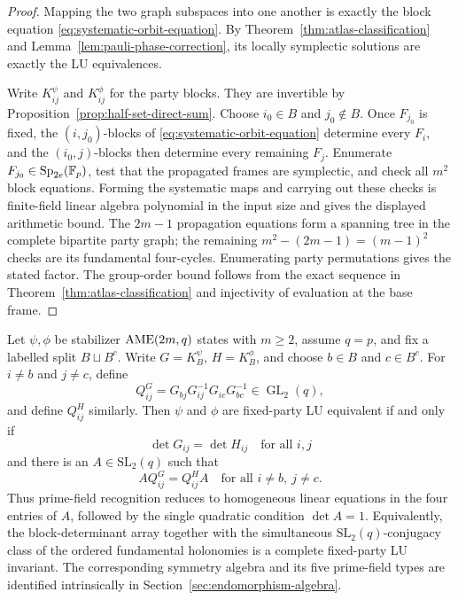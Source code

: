 \begin{proof}
Mapping the two graph subspaces into one another is exactly the block
equation \eqref{eq:systematic-orbit-equation}.  By Theorem~\ref{thm:atlas-classification} and
Lemma~\ref{lem:pauli-phase-correction}, its locally symplectic solutions
are exactly the LU equivalences.

Write \(K^\psi_{ij}\) and \(K^\phi_{ij}\) for the party blocks.  They are
invertible by Proposition~\ref{prop:half-set-direct-sum}.  Choose
\(i_0\in B\) and \(j_0\notin B\).  Once \(F_{j_0}\) is fixed, the
\((i,j_0)\)-blocks of \eqref{eq:systematic-orbit-equation} determine every \(F_i\), and the
\((i_0,j)\)-blocks then determine every remaining \(F_j\).  Enumerate
\(F_{j_0}\in\operatorname{Sp}_{2e}(\mathbb F_p)\), test that the propagated
frames are symplectic, and check all \(m^2\) block equations.  Forming the
systematic maps and carrying out these checks is finite-field linear
algebra polynomial in the input size and gives the displayed arithmetic
bound.  The \(2m-1\) propagation equations form a spanning tree in the
complete bipartite party graph; the remaining
\(m^2-(2m-1)=(m-1)^2\) checks are its fundamental four-cycles.
Enumerating party permutations gives the stated factor.  The group-order
bound follows from the exact sequence in
Theorem~\ref{thm:atlas-classification} and injectivity of evaluation at the
base frame.
\end{proof}

\begin{corollary}
\label{cor:prime-systematic-recognition}
Let \(\psi,\phi\) be stabilizer \(\mathrm{AME}(2m,q)\) states with \(m\geq2\),
assume \(q=p\), and fix a labelled split \(B\sqcup B^c\).  Write
\(G=K_B^\psi\), \(H=K_B^\phi\), and choose
\(b\in B\) and \(c\in B^c\).  For \(i\ne b\) and \(j\ne c\), define
\[
 Q^G_{ij}
 =G_{bj}G_{ij}^{-1}G_{ic}G_{bc}^{-1}\in\operatorname{GL}_2(q),
\]
and define \(Q^H_{ij}\) similarly.  Then \(\psi\) and \(\phi\) are
fixed-party LU equivalent if and only if
\[
 \det G_{ij}=\det H_{ij}\quad\text{for all \(i,j\)}
\]
and there is an \(A\in\mathrm{SL}_2(q)\) such that
\[
 A Q^G_{ij}=Q^H_{ij}A
 \quad\text{for all \(i\ne b,\ j\ne c\)}.
\]
Thus prime-field recognition reduces to homogeneous linear equations in
the four entries of \(A\), followed by the single quadratic condition
\(\det A=1\).  Equivalently, the block-determinant array together with the
simultaneous \(\mathrm{SL}_2(q)\)-conjugacy class of the ordered fundamental
holonomies is a complete fixed-party LU invariant.  The corresponding
symmetry algebra and its five prime-field types are identified intrinsically
in Section~\ref{sec:endomorphism-algebra}.
\end{corollary}

